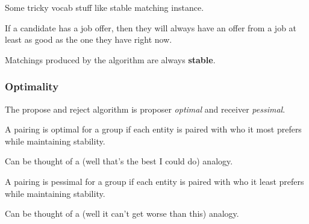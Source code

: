 Some tricky vocab stuff like stable matching instance. 

\begin{lemma}[Improvement]
    If a candidate has a job offer, then they will always have an offer from a job at least as good as the one they have right now. 
\end{lemma}

Matchings produced by the algorithm are always \textbf{stable}. 

\subsubsection{Optimality}

The propose and reject algorithm is proposer \textit{optimal} and receiver \textit{pessimal}.

\begin{definition}[optimal]
    A pairing is optimal for a group if each entity is paired with who it most prefers  while maintaining stability. 
\end{definition}

Can be thought of a (well that's the best I could do) analogy. 

\begin{definition}[pessimal]
    A pairing is pessimal for a group if each entity is paired with who it least prefers while maintaining stability.
\end{definition}

Can be thought of a (well it can't get worse than this) analogy. 